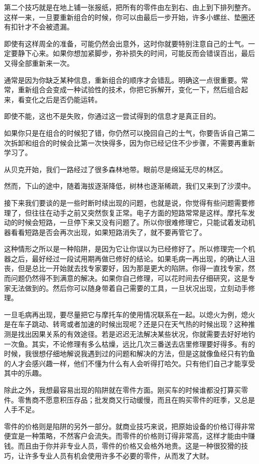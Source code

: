 \documentclass[UTF8]{article}
\begin{document}
\par 第二个技巧就是在地上铺一张报纸，把所有的零件由左到右、由上到下排列整齐。这样一来，一旦要重新组合的时候，你可以由最后一步开始，许多小螺丝、垫圈还有扣针才不会被遗漏。
\par 即使有这样周全的准备，可能仍然会出意外，这时你就要特别注意自己的士气。一定要静下心来。如果你想加紧脚步，弥补损失的时间，可能反而会错误百出，最后又得全部重新来一次。
\par 通常是因为你缺乏某种信息，重新组合的顺序才会错乱。明确这一点很重要。常常，重新组合会变成一种试验性的技术，你把它拆解开，变化一下，然后组合起来，看变化之后是否仍能运转。
\par 即使不能，这也不是失败，你通过这一尝试得到的信息才是真正目的。
\par 如果你只是在组合的时候犯了错，你仍然可以挽回自己的士气，你要告诉自己第二次拆卸和组合的时候会比第一次快得多，因为你已经记住不少步骤，不需要再重新学习了。
\par 从贝克开始，我们一路经过了很多森林地带。眼前尽是绵延无尽的林区。
\par 然而，下山的途中，随着海拔逐渐降低，树林也逐渐稀疏，我们又来到了沙漠中。
\par 接下来我们要谈的是一些时断时续出现的问题，也就是说，你觉得有些问题需要修理了，但往往在动手之前又突然恢复正常。电子方面的短路常常是这样。摩托车发动的时候会短路，一旦停下来又没有问题了。所以你很难修理它，只能试着发动机器看看短路是否会再次出现，如果短路消失了，就不要再管它了。
\par 这种情形之所以是一种陷阱，是因为它让你误以为已经修好了。所以修理完一个机器之后，最好经过一段试用期再做已修好的结论。如果毛病一再出现，的确让人沮丧，但是总比一开始就去找专家要好，因为那是更大的陷阱。你得一直找专家，然而问题仍然得不到满意的解决。如果你自己修理，可以花时间去仔细研究，这是专家无法做到的。然后你可以随身带着自己需要的工具，一旦状况出现，立刻动手修理。
\par 一旦毛病再出现，要尽量把它与摩托车的使用情况联系在一起。以熄火为例，熄火是在车子跳动、转弯或者加速的时候出现呢？还是只在天气热的时候出现？这种推测是找出因果关系的有效途径。若是迟迟无法解决某些状况，你就需要去好好地钓一次鱼。其实，不论修理有多么枯燥，远比几次三番送去店里修理要好得多。有的时候，我很想仔细地解说我遇到过的问题和解决的方法，但是这就像鱼经只有钓鱼的人才会感兴趣一样，他们不懂为什么有人会听得打哈欠。只有他们自己才能享受其中的乐趣。
\par 除此之外，我想最容易出现的陷阱就在零件方面。刚买车的时候谁都没打算买零件。零售商不愿意积压存品；批发商又行动缓慢，而且在购买零件的旺季，又总是人手不足。
\par 零件的价格则是陷阱的另外一部分。就商业技巧来说，把原始设备的价格订得非常便宜是一种策略，不然客户会流失。而零件的价格则订得非常高，这样才能由中赚钱。而且由于你并非专业人员，零件的价格又会格外地贵。这是一种很狡猾的技巧，让许多专业人员有机会使用许多不必要的零件，从而发了大财。
\end{document}
